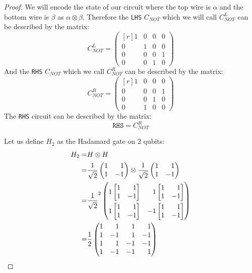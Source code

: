 \begin{proof}
We will encode the state of our circuit where the top wire is $\alpha$ and the bottom wire is $\beta$ as $\alpha \otimes \beta$.
Therefore the \texttt{LHS} $C_{NOT}$ which we will call $C_{NOT}^L$ can be described by the matrix: 
\[
C_{NOT}^L = \begin{pmatrix*}[r] 1&0&0&0 \\ 0&1&0&0 \\ 0&0&0&1\\0&0&1&0 \end{pmatrix*}
\]
And the \texttt{RHS} $C_{NOT}$ which we call $C_{NOT}^R$ can be described by the matrix:
\[
C_{NOT}^R = \begin{pmatrix*}[r] 1&0&0&0 \\ 0&0&0&1 \\ 0&0&1&0\\0&1&0&0 \end{pmatrix*}
\]
The \texttt{RHS} circuit can be described by the matrix:
\[
    \texttt{RHS} = C_{NOT}^R   
\]

\noindent Let us define $H_2$ as the Hadamard gate on 2 qubits:
\begin{align*}
    H_2 =& H \otimes H\\
    =&\frac{1}{\sqrt{2}}\hman \otimes \frac{1}{\sqrt{2}}\hman\\
    =&\frac{1}{\sqrt{2}}^2 \tallcols{2.1}{\begin{pmatrix*}[r] 1 \normrows{\bhman} & 1\normrows{\bhman} \\ 1 \normrows{\bhman} & -1 \normrows{\bhman} \end{pmatrix*}}\\
    =&\frac{1}{2} \hmantwo
\end{align*}


\end{proof}
